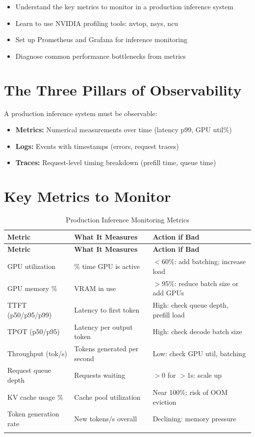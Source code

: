 \documentclass[10pt, oneside, openany]{book}
\newenvironment{learningobjectives}
  {\begin{tcolorbox}[enhanced, breakable,
    colback={rgb,255:red,232;green,240;blue,255},
    colframe=NavyBlue, boxrule=1.5pt, arc=4pt,
    title={\bfseries Learning Objectives},
    fonttitle=\bfseries\color{white},
    attach boxed title to top left={yshift=-2mm, xshift=5mm},
    boxed title style={colback=NavyBlue, arc=2pt}]
  \begin{itemize}[leftmargin=1.5em, itemsep=2pt]}
  {\end{itemize}\end{tcolorbox}}
\begin{document}
\begin{learningobjectives}
  \item Understand the key metrics to monitor in a production inference system
  \item Learn to use NVIDIA profiling tools: nvtop, nsys, ncu
  \item Set up Prometheus and Grafana for inference monitoring
  \item Diagnose common performance bottlenecks from metrics
\end{learningobjectives}

\section{The Three Pillars of Observability}

A production inference system must be observable:

\begin{itemize}
  \item \textbf{Metrics:} Numerical measurements over time (latency p99, GPU util\%)
  \item \textbf{Logs:} Events with timestamps (errors, request traces)
  \item \textbf{Traces:} Request-level timing breakdown (prefill time, queue time)
\end{itemize}

\section{Key Metrics to Monitor}

\begin{longtable}{@{}p{3.5cm}p{4cm}p{5cm}@{}}
  \toprule
  \textbf{Metric} & \textbf{What It Measures} & \textbf{Action if Bad} \\
  \midrule
  \endfirsthead
  \toprule
  \textbf{Metric} & \textbf{What It Measures} & \textbf{Action if Bad} \\
  \midrule
  \endhead
  GPU utilization & \% time GPU is active & $<$60\%: add batching; increase load \\
  GPU memory \% & VRAM in use & $>$95\%: reduce batch size or add GPUs \\
  TTFT (p50/p95/p99) & Latency to first token & High: check queue depth, prefill load \\
  TPOT (p50/p95) & Latency per output token & High: check decode batch size \\
  Throughput (tok/s) & Tokens generated per second & Low: check GPU util, batching \\
  Request queue depth & Requests waiting & $>$0 for $>$1s: scale up \\
  KV cache usage \% & Cache pool utilization & Near 100\%: risk of OOM eviction \\
  Token generation rate & New tokens/s overall & Declining: memory pressure \\
  \bottomrule
  \caption{Production Inference Monitoring Metrics}
\end{longtable}
\end{document}
